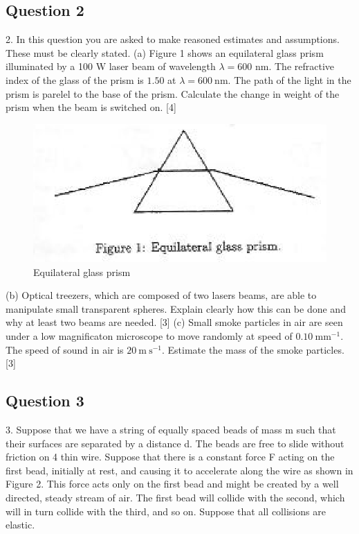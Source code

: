 \documentclass{article}
\begin{document}
\subsection{Question 2}
2. In this question you are asked to make reasoned estimates and assumptions. These must be clearly stated.
(a) Figure 1 shows an equilateral glass prism illuminated by a 100 W laser beam of wavelength $\lambda=600$ nm. The refractive index of the glass of the prism is $1.50$ at $\lambda=600 \mathrm{~nm}$. The path of the light in the prism is parelel to the base of the prism. Calculate the change in weight of the prism when the beam is switched on. [4]
\begin{figure}
	\centering
	\includegraphics[width=0.8\linewidth]{spho_book_TYS_images/2011q2.png}
	\caption{Equilateral glass prism}
\end{figure}
(b) Optical treezers, which are composed of two lasers beams, are able to manipulate small transparent spheres. Explain clearly how this can be done and why at least two beams are needed. [3]
(c) Small smoke particles in air are seen under a low magnificaton microscope to move randomly at speed of $0.10 \mathrm{~mm}^{-1}$. The speed of sound in air is $20 \mathrm{~m} \mathrm{~s}^{-1}$. Estimate the mass of the smoke particles. [3]

\subsection{Question 3}
3. Suppose that we have a string of equally spaced beads of mass m such that their
surfaces are separated by a distance d. The beads are free to slide without friction
on 4 thin wire. Suppose that there is a constant force F acting on the first bead,
initially at rest, and causing it to accelerate along the wire as shown in Figure 2.
This force acts only on the first bead and might be created by a well directed, steady
stream of air. The first bead will collide with the second, which will in turn collide
with the third, and so on. Suppose that all collisions are elastic.
\end{document}
